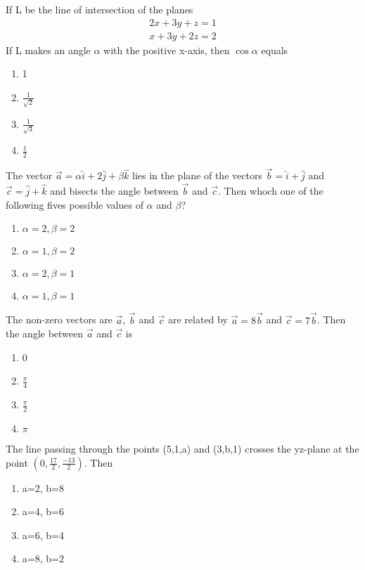 \item If L be the line of intersection of the planes 
\begin{align*}
2x+3y+z=1
\end{align*}
\begin{align*}
x+3y+2z=2
\end{align*}
If L makes an angle $\alpha$ with the positive x-axis, then $\cos\alpha$ equals
\begin{enumerate}
\item 1
\item $\frac{1}{\sqrt{2}}$
\item $\frac{1}{\sqrt{3}}$
\item $\frac{1}{2}$
\end{enumerate}

\item The vector $\overrightarrow{a}=\alpha\hat{i}+2\hat{j}+\beta\hat{k}$ lies in the plane of the vectors $\overrightarrow{b}=\hat{i}+\hat{j}$ and $\overrightarrow{c}=\hat{j}+\hat{k}$ and bisects the angle between $\overrightarrow{b}$ and $\overrightarrow{c}$. Then whoch one of the following fives possible values of $\alpha$ and $\beta$?
\begin{enumerate}
\item $\alpha=2, \beta=2$
\item $\alpha=1, \beta=2$
\item $\alpha=2, \beta=1$
\item $\alpha=1, \beta=1$
\end{enumerate}

\item The non-zero vectors are $\overrightarrow{a}$, $\overrightarrow{b}$ and $\overrightarrow{c}$ are related by $\overrightarrow{a}=8\overrightarrow{b}$ and $\overrightarrow{c}=7\overrightarrow{b}$. Then the angle between $\overrightarrow{a}$ and $\overrightarrow{c}$ is
\begin{enumerate}
\item 0
\item $\frac{\pi}{4}$
\item $\frac{\pi}{2}$
\item $\pi$
\end{enumerate}

\item The line passing through the points (5,1,a) and (3,b,1) crosses the yz-plane at the point $(0,\frac{17}{2},\frac{-13}{2})$. Then
\begin{enumerate}
\item a=2, b=8
\item a=4, b=6
\item a=6, b=4
\item a=8, b=2
\end{enumerate}

